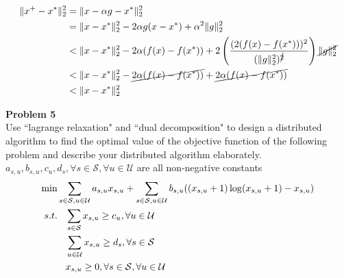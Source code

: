 \documentclass[12pt,letter]{article}
\newcommand{\problem}[1]{\vspace{3mm}\Large\textbf{{Problem {#1}\vspace{3mm}}}\normalsize\\}
\begin{document}
\begin{align*}
\|x^+ - x^*\|_2^2 &= \|x-\alpha g - x^*\|_2^2 \\
		  &= \|x-x^*\|_2^2 - 2\alpha g(x-x^*) + \alpha^2 \|g\|_2^2\\
		  &< \|x-x^*\|_2^2 - 2\alpha(f(x)-f(x^*)) + 2\left(\frac{(2(f(x)-f(x^*)))^2}{(\|g\|_2^2)^{\cancel{2}}}\right)\cancel{\|g\|_2^2}\\
                  &< \|x-x^*\|_2^2 - \cancel{2\alpha(f(x)-f(x^*))} + \cancel{2\alpha(f(x)-f(x^*))}\\
		  &< \|x-x^*\|_2^2 
\end{align*}

\problem{5}
Use ``lagrange relaxation" and ``dual decomposition" to design a distributed 
algorithm to find the optimal value of the objective function of the following 
problem and describe your distributed algorithm elaborately. 
$a_{s,u}, b_{s,u}, c_u, d_s, \forall s\in \mathcal{S}, \forall u \in \mathcal{U}$
are all non-negative constants
\begin{align*}
\min\hspace{3mm}&\hspace{-3mm}\sum\limits_{s\in\mathcal{S},u\in\mathcal{U}}a_{s,u}x_{s,u} + 
	\sum\limits_{s\in\mathcal{S},u\in\mathcal{U}}b_{s,u}((x_{s,u}+1)\log(x_{s,u}+1)-x_{s,u})\\
s.t.\hspace{3mm} &\sum\limits_{s\in\mathcal{S}}x_{s,u}\geq c_u, \forall u\in\mathcal{U}\\ 
     &\sum\limits_{u\in\mathcal{U}}x_{s,u}\geq d_s, \forall s\in\mathcal{S}\\
     &x_{s,u}\geq 0, \forall s\in\mathcal{S}, \forall u\in\mathcal{U}
\end{align*}
\end{document}
